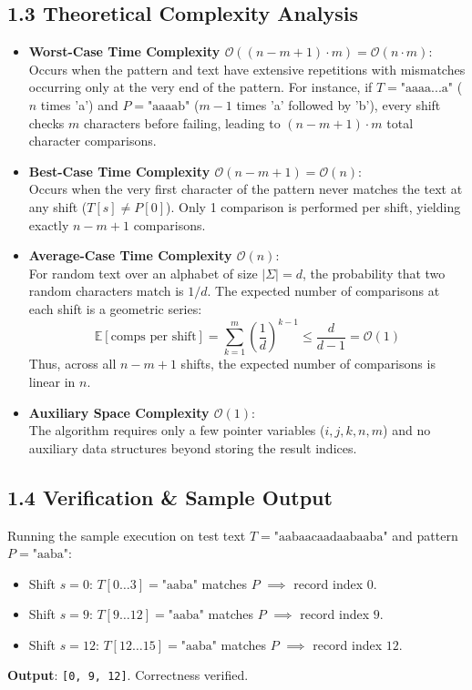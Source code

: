 \documentclass[12pt]{article}
\begin{document}
\subsection*{1.3 Theoretical Complexity Analysis}
\begin{itemize}
    \item \textbf{Worst-Case Time Complexity $\mathcal{O}((n - m + 1) \cdot m) = \mathcal{O}(n \cdot m)$}:\\
    Occurs when the pattern and text have extensive repetitions with mismatches occurring only at the very end of the pattern. For instance, if $T = \text{"aaaa...a"}$ ($n$ times 'a') and $P = \text{"aaaab"}$ ($m-1$ times 'a' followed by 'b'), every shift checks $m$ characters before failing, leading to $(n - m + 1) \cdot m$ total character comparisons.
    
    \item \textbf{Best-Case Time Complexity $\mathcal{O}(n - m + 1) = \mathcal{O}(n)$}:\\
    Occurs when the very first character of the pattern never matches the text at any shift ($T[s] \ne P[0]$). Only 1 comparison is performed per shift, yielding exactly $n - m + 1$ comparisons.
    
    \item \textbf{Average-Case Time Complexity $\mathcal{O}(n)$}:\\
    For random text over an alphabet of size $|\Sigma| = d$, the probability that two random characters match is $1/d$. The expected number of comparisons at each shift is a geometric series:
    \[
    \mathbb{E}[\text{comps per shift}] = \sum_{k=1}^{m} \left(\frac{1}{d}\right)^{k-1} \le \frac{d}{d-1} = \mathcal{O}(1)
    \]
    Thus, across all $n-m+1$ shifts, the expected number of comparisons is linear in $n$.
    
    \item \textbf{Auxiliary Space Complexity $\mathcal{O}(1)$}:\\
    The algorithm requires only a few pointer variables ($i, j, k, n, m$) and no auxiliary data structures beyond storing the result indices.
\end{itemize}

\subsection*{1.4 Verification \& Sample Output}
Running the sample execution on test text $T = \text{"aabaacaadaabaaba"}$ and pattern $P = \text{"aaba"}$:
\begin{itemize}
    \item Shift $s = 0$: $T[0\dots 3] = \text{"aaba"}$ matches $P$ $\implies$ record index $0$.
    \item Shift $s = 9$: $T[9\dots 12] = \text{"aaba"}$ matches $P$ $\implies$ record index $9$.
    \item Shift $s = 12$: $T[12\dots 15] = \text{"aaba"}$ matches $P$ $\implies$ record index $12$.
\end{itemize}
\textbf{Output}: \texttt{[0, 9, 12]}. Correctness verified.
\end{document}
